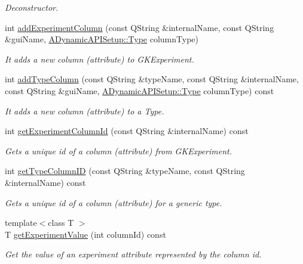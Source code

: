 \begin{DoxyCompactItemize}
\begin{DoxyCompactList}\small\item\em Deconstructor. \end{DoxyCompactList}\item 
int \hyperlink{classADynamicAPISetup_a12384f9e9cc8275040a5199a59c3803e}{add\+Experiment\+Column} (const Q\+String \&internal\+Name, const Q\+String \&gui\+Name, \hyperlink{classADynamicAPISetup_a0ffce2ed1acaeaf1f058fab833e375c3}{A\+Dynamic\+A\+P\+I\+Setup\+::\+Type} column\+Type)
\begin{DoxyCompactList}\small\item\em It adds a new column (attribute) to G\+K\+Experiment. \end{DoxyCompactList}\item 
int \hyperlink{classADynamicAPISetup_a4d4f228468a6d066f08441fc924ac61b}{add\+Type\+Column} (const Q\+String \&type\+Name, const Q\+String \&internal\+Name, const Q\+String \&gui\+Name, \hyperlink{classADynamicAPISetup_a0ffce2ed1acaeaf1f058fab833e375c3}{A\+Dynamic\+A\+P\+I\+Setup\+::\+Type} column\+Type) const 
\begin{DoxyCompactList}\small\item\em It adds a new column (attribute) to a Type. \end{DoxyCompactList}\item 
int \hyperlink{classADynamicAPISetup_a217f8ef15bf6d83075b987dace758867}{get\+Experiment\+Column\+Id} (const Q\+String \&internal\+Name) const 
\begin{DoxyCompactList}\small\item\em Gets a unique id of a column (attribute) from G\+K\+Experiment. \end{DoxyCompactList}\item 
int \hyperlink{classADynamicAPISetup_abf39333e1b293f862f9b0f7e6d16ed6a}{get\+Type\+Column\+ID} (const Q\+String \&type\+Name, const Q\+String \&internal\+Name) const 
\begin{DoxyCompactList}\small\item\em Gets a unique id of a column (attribute) for a generic type. \end{DoxyCompactList}\item 
{\footnotesize template$<$class T $>$ }\\T \hyperlink{classADynamicAPISetup_abb5a2457bcb09ac3ab852b39241a5423}{get\+Experiment\+Value} (int column\+Id) const 
\begin{DoxyCompactList}\small\item\em Get the value of an experiment attribute represented by the column id. \end{DoxyCompactList}\item 

\end{DoxyCompactItemize}

